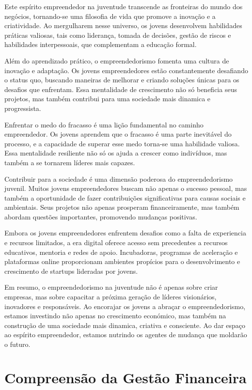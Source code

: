 \documentclass{report}
\begin{document}
Este espírito empreendedor na juventude transcende as fronteiras do mundo dos negócios, tornando-se uma filosofia de vida que promove a inovação e a criatividade. Ao mergulharem nesse universo, os jovens desenvolvem habilidades práticas valiosas, tais como liderança, tomada de decisões, gestão de riscos e habilidades interpessoais, que complementam a educação formal.

Além do aprendizado prático, o empreendedorismo fomenta uma cultura de inovação e adaptação. Os jovens empreendedores estão constantemente desafiando o status quo, buscando maneiras de melhorar e criando soluções únicas para os desafios que enfrentam. Essa mentalidade de crescimento não só beneficia seus projetos, mas também contribui para uma sociedade mais dinamica e progressista.

Enfrentar o medo do fracasso é uma lição fundamental no caminho empreendedor. Os jovens aprendem que o fracasso é uma parte inevitável do processo, e a capacidade de superar esse medo torna-se uma habilidade valiosa. Essa mentalidade resiliente não só os ajuda a crescer como indivíduos, mas também a se tornarem líderes mais capazes.

Contribuir para a sociedade é uma dimensão poderosa do empreendedorismo juvenil. Muitos jovens empreendedores buscam não apenas o sucesso pessoal, mas também a oportunidade de fazer contribuições significativas para causas sociais e ambientais. Seus projetos não apenas prosperam financeiramente, mas também abordam questões importantes, promovendo mudanças positivas.

Embora os jovens empreendedores enfrentem desafios como a falta de experiencia e recursos limitados, a era digital oferece acesso sem precedentes a recursos educativos, mentoria e redes de apoio. Incubadoras, programas de aceleração e plataformas online proporcionam ambientes propícios para o desenvolvimento e crescimento de startups lideradas por jovens.

Em resumo, o empreendedorismo na juventude não é apenas sobre criar empresas, mas sobre capacitar a próxima geração de líderes visionários, inovadores e responsáveis. Ao encorajar os jovens a abraçar o empreendedorismo, estamos investindo não apenas no crescimento económico, mas também na construção de uma sociedade mais dinamica, criativa e consciente. Ao dar espaço ao espírito empreendedor, estamos nutrindo os agentes de mudança que moldarão o futuro.

\chapter{Compreensão da Gestão Financeira}
\label{chap.analise}
\end{document}
